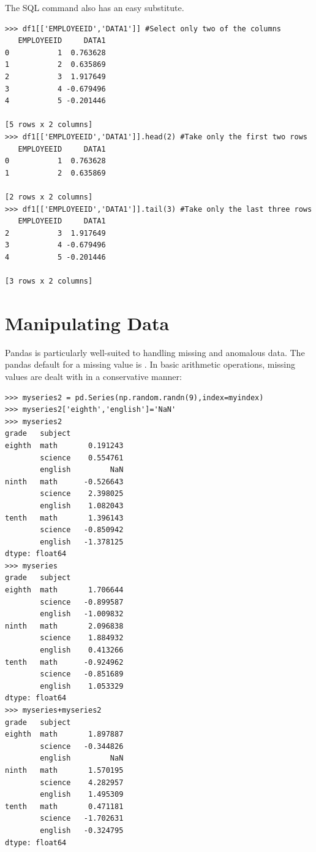 The SQL command  also has an easy substitute.

\begin{lstlisting}
>>> df1[['EMPLOYEEID','DATA1']] #Select only two of the columns
   EMPLOYEEID     DATA1
0           1  0.763628
1           2  0.635869
2           3  1.917649
3           4 -0.679496
4           5 -0.201446

[5 rows x 2 columns]
>>> df1[['EMPLOYEEID','DATA1']].head(2) #Take only the first two rows
   EMPLOYEEID     DATA1
0           1  0.763628
1           2  0.635869

[2 rows x 2 columns]
>>> df1[['EMPLOYEEID','DATA1']].tail(3) #Take only the last three rows
   EMPLOYEEID     DATA1
2           3  1.917649
3           4 -0.679496
4           5 -0.201446

[3 rows x 2 columns]
\end{lstlisting}

\section*{Manipulating Data}

Pandas is particularly well-suited to handling missing and anomalous data. The pandas default for a missing value is . In basic arithmetic operations, missing values are dealt with in a conservative manner:

\begin{lstlisting}
>>> myseries2 = pd.Series(np.random.randn(9),index=myindex)
>>> myseries2['eighth','english']='NaN'
>>> myseries2
grade   subject
eighth  math       0.191243
        science    0.554761
        english         NaN
ninth   math      -0.526643
        science    2.398025
        english    1.082043
tenth   math       1.396143
        science   -0.850942
        english   -1.378125
dtype: float64
>>> myseries
grade   subject
eighth  math       1.706644
        science   -0.899587
        english   -1.009832
ninth   math       2.096838
        science    1.884932
        english    0.413266
tenth   math      -0.924962
        science   -0.851689
        english    1.053329
dtype: float64
>>> myseries+myseries2
grade   subject
eighth  math       1.897887
        science   -0.344826
        english         NaN
ninth   math       1.570195
        science    4.282957
        english    1.495309
tenth   math       0.471181
        science   -1.702631
        english   -0.324795
dtype: float64
\end{lstlisting}


